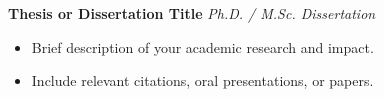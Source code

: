 \vspace{2mm}
\textbf{{{ Thesis or Dissertation Title }}} \hfill{\sl Ph.D. / M.Sc. Dissertation} \\

\begin{itemize} \itemsep -3pt
    \item Brief description of your academic research and impact.
    \item Include relevant citations, oral presentations, or papers.
\end{itemize}
